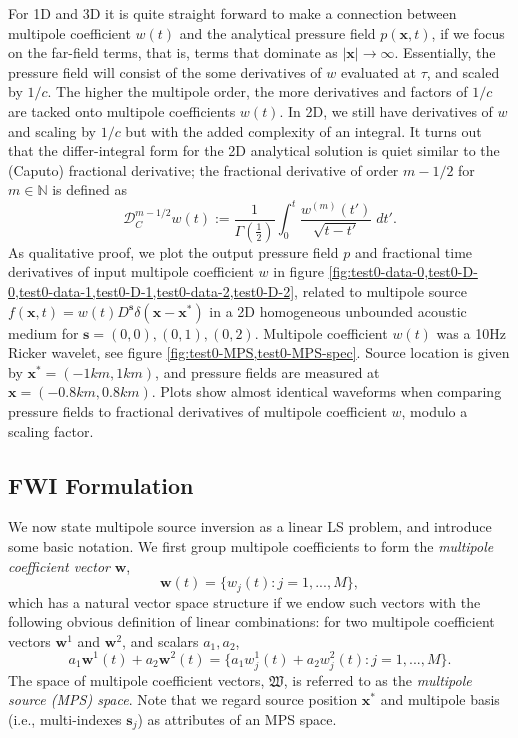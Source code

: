 For 1D and 3D it is quite straight forward to make a connection between multipole coefficient $w(t)$ and the analytical pressure field $p(\mathbf x,t)$, if we focus on the far-field terms, that is, terms that dominate as $|\mathbf x|\to\infty$.
Essentially, the pressure field will consist of the some derivatives of $w$ evaluated at $\tau$, and scaled by $1/c$.
The higher the multipole order, the more derivatives and factors of $1/c$ are tacked onto multipole coefficients $w(t)$.
In 2D, we still have derivatives of $w$ and scaling by $1/c$ but with the added complexity of an integral.
It turns out that the differ-integral form for the 2D analytical solution is quiet similar to the (Caputo) fractional derivative; the fractional derivative of order $m-1/2$ for $m\in\mathbb N$ is defined as
\[
        \mathcal{D}^{m-1/2}_C w(t) := \frac{1}{\Gamma(\tfrac{1}{2})} \int_{0}^t \frac{w^{(m)}(t')}{ \sqrt{t-t'}} \; dt'.
\]
As qualitative proof, we plot the output pressure field $p$ and fractional time derivatives of input multipole coefficient $w$ in figure \ref{fig:test0-data-0,test0-D-0,test0-data-1,test0-D-1,test0-data-2,test0-D-2}, related to multipole source $f(\mathbf x, t) =  w(t) D^{\mathbf s}\delta(\mathbf x - \mathbf x^*)$ in a 2D homogeneous unbounded acoustic medium for $\mathbf s = (0,0), (0,1), (0,2)$.
Multipole coefficient $w(t)$ was a 10Hz Ricker wavelet, see figure \ref{fig:test0-MPS,test0-MPS-spec}. 
Source location is given by $\mathbf x^* = (-1km,1km)$, and pressure fields are measured at $\mathbf x = (-0.8km,0.8km)$. 
Plots show almost identical waveforms when comparing pressure fields to fractional derivatives of multipole coefficient $w$, modulo a scaling factor.

\subsection{FWI Formulation}

We now state multipole source inversion as a linear LS problem, and introduce some basic notation.
We first group multipole coefficients to form the {\em multipole coefficient vector} $\mathbf w$,
\[
	\mathbf w(t) = \{w_j(t) : j=1,...,M\},
\]
which has a natural vector space structure if we endow such vectors with the following obvious definition of linear combinations: for two multipole coefficient vectors $\mathbf w^1$ and $\mathbf w^2$, and scalars $a_1,a_2$,
\[
	a_1\mathbf w^1(t) + a_2 \mathbf w^2(t) = \{a_1w^{1}_j(t) + a_2 w^{2}_j(t) : j=1,...,M\}.
\]
The space of multipole coefficient vectors, $\mathfrak W$, is referred to as the {\em multipole source (MPS) space}.
Note that we regard source position $\mathbf x^*$ and multipole basis (i.e., multi-indexes $\mathbf s_j$) as attributes of an MPS space.

